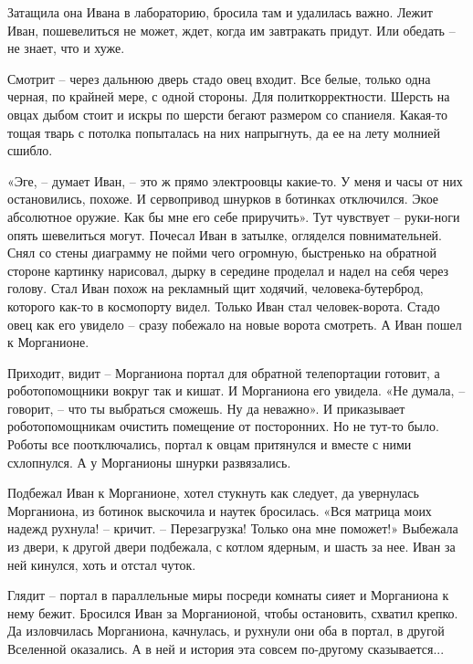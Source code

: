 \documentclass[ebook,oneside,final,openright]{memoir}
\begin{document}
\par
Затащила она Ивана в лабораторию, бросила там и удалилась важно. Лежит Иван, пошевелиться не может, ждет, когда им завтракать придут. Или обедать – не знает, что и хуже. \par
Смотрит – через дальнюю дверь стадо овец входит. Все белые, только одна черная, по крайней мере, с одной стороны. Для политкорректности. Шерсть на овцах дыбом стоит и искры по шерсти бегают размером со спаниеля. Какая-то тощая тварь с потолка попыталась на них напрыгнуть, да ее на лету молнией сшибло.\par
\par
«Эге, – думает Иван, – это ж прямо электроовцы какие-то. У меня и часы от них остановились, похоже. И сервопривод шнурков в ботинках отключился. Экое абсолютное оружие. Как бы мне его себе приручить». Тут чувствует – руки-ноги опять шевелиться могут. Почесал Иван в затылке, огляделся повнимательней. Снял со стены диаграмму не пойми чего огромную, быстренько на обратной стороне картинку нарисовал, дырку в середине проделал и надел на себя через голову. Стал Иван похож на рекламный щит ходячий, человека-бутерброд, которого как-то в космопорту видел. Только Иван стал человек-ворота. Стадо овец как его увидело – сразу побежало на новые ворота смотреть. А Иван пошел к Морганионе.\par
\par
Приходит, видит – Морганиона портал для обратной телепортации готовит, а роботопомощники вокруг так и кишат. И Морганиона его увидела. «Не думала, – говорит, – что ты выбраться сможешь. Ну да неважно». И приказывает роботопомощникам очистить помещение от посторонних. Но не тут-то было. Роботы все поотключались, портал к овцам притянулся и вместе с ними схлопнулся. А у Морганионы шнурки развязались.\par
\par
Подбежал Иван к Морганионе, хотел стукнуть как следует, да увернулась Морганиона, из ботинок выскочила и наутек бросилась. «Вся матрица моих надежд рухнула! – кричит. – Перезагрузка! Только она мне поможет!» Выбежала из двери, к другой двери подбежала, с котлом ядерным, и шасть за нее. Иван за ней кинулся, хоть и отстал чуток.\par
\par
Глядит – портал в параллельные миры посреди комнаты сияет и Морганиона к нему бежит. Бросился Иван за Морганионой, чтобы остановить, схватил крепко. Да изловчилась Морганиона, качнулась, и рухнули они оба в портал, в другой Вселенной оказались. А в ней и история эта совсем по-другому сказывается...\par
\end{document}
